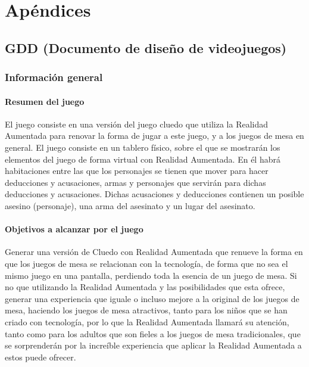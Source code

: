\chapter{Apéndices}
\label{ch:apendices}


\section{GDD (Documento de diseño de videojuegos)} \label{documento-diseño-videojuegos}

\subsection{Información general}

\subsubsection{Resumen del juego}
El juego consiste en una versión del juego cluedo que utiliza la Realidad Aumentada para renovar la forma de jugar a este juego, y a los juegos de mesa en general. El juego consiste en un tablero físico, sobre el que se mostrarán los elementos del juego de forma virtual con Realidad Aumentada. En él habrá habitaciones entre las que los personajes se tienen que mover para hacer deducciones y acusaciones, armas y personajes que servirán para dichas deducciones y acusaciones. Dichas acusaciones y deducciones contienen un posible asesino (personaje), una arma del asesinato y un lugar del asesinato.

\subsubsection{Objetivos a alcanzar por el juego}
Generar una versión de Cluedo con Realidad Aumentada que renueve la forma en que los juegos de mesa se relacionan con la tecnología, de forma que no sea el mismo juego en una pantalla, perdiendo toda la esencia de un juego de mesa. Si no que utilizando la Realidad Aumentada y las posibilidades que esta ofrece, generar una experiencia que iguale o incluso mejore a la original de los juegos de mesa, haciendo los juegos de mesa atractivos, tanto para los niños que se han criado con tecnología, por lo que la Realidad Aumentada llamará su atención, tanto como para los adultos que son fieles a los juegos de mesa tradicionales, que se sorprenderán por la increíble experiencia que aplicar la Realidad Aumentada a estos puede ofrecer.

